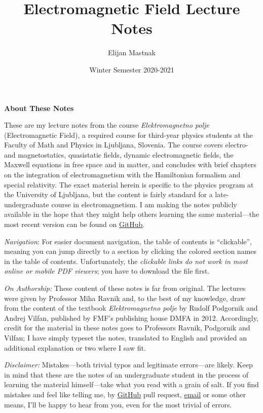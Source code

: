 \documentclass[11pt, a4paper]{article}
\begin{document}
\title{Electromagnetic Field Lecture Notes}
\author{Elijan Mastnak}
\date{Winter Semester 2020-2021}
\maketitle

\begin{center}
    \textbf{About These Notes}
\end{center}

These are my lecture notes from the course \textit{Elektromagnetno polje} (Electromagnetic Field), a required course for third-year physics students at the Faculty of Math and Physics in Ljubljana, Slovenia. The course covers electro- and magnetostatics, quasistatic fields, dynamic electromagnetic fields, the Maxwell equations in free space and in matter, and concludes with brief chapters on the integration of electromagnetism with the Hamiltonian formalism and special relativity. The exact material herein is specific to the physics program at the University of Ljubljana, but the content is fairly standard for a late-undergraduate course in electromagnetism. I am making the notes publicly available in the hope that they might help others learning the same material---the most recent version can be found on \href{https://github.com/ejmastnak/fmf/tree/main/electromagnetic-field}{\underline{GitHub}}.

\vspace{2mm}
\textit{Navigation}: For easier document navigation, the table of contents is ``clickable'', meaning you can jump directly to a section by clicking the colored section names in the table of contents. Unfortunately, the \textit{clickable links do not work in most online or mobile PDF viewers}; you have to download the file first.

\vspace{2mm}
\textit{On Authorship:} These content of these notes is far from original. The lectures were given by Professor Miha Ravnik and, to the best of my knowledge, draw from the content of the textbook \textit{Elektromagnetno polje} by Rudolf Podgornik and Andrej Vilfan, published by FMF's publishing house DMFA in 2012. Accordingly, credit for the material in these notes goes to Professors Ravnik, Podgornik and Vilfan; I have simply typeset the notes, translated to English and provided an additional explanation or two where I saw fit.

\vspace{2mm}
\textit{Disclaimer:} Mistakes---both trivial typos and legitimate errors---are likely. Keep in mind that these are the notes of an undergraduate student in the process of learning the material himself---take what you read with a grain of salt. If you find mistakes and feel like telling me, by \href{https://github.com/ejmastnak/fmf}{\underline{GitHub}} pull request, \href{mailto:ejmastnak@gmail.com}{\underline{email}} or some other means, I'll be happy to hear from you, even for the most trivial of errors.
\end{document}
